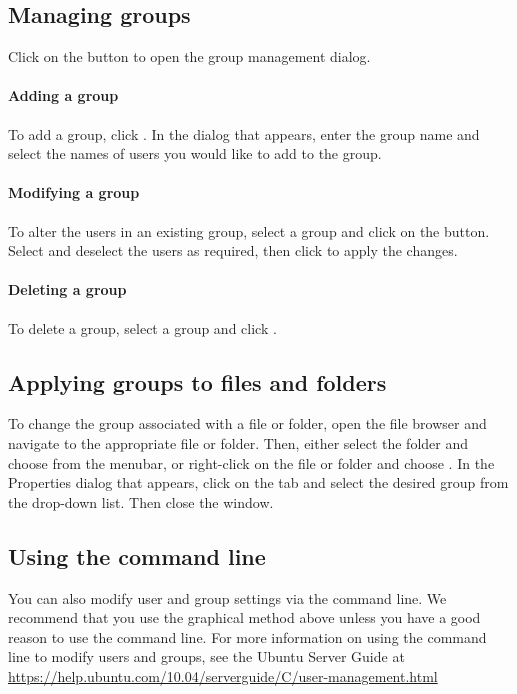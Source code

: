 \subsection{Managing groups}
\label{sec:security:managing-groups}

Click on the  button to open the group management dialog.

\paragraph{Adding a group}
To add a group, click . In the dialog that appears, enter the group name and select the names of users you would like to add to the group.

\paragraph{Modifying a group}
To alter the users in an existing group, select a group and click on the  button. Select and deselect the users as required, then click  to apply the changes.

\paragraph{Deleting a group}
To delete a group, select a group and click .

\subsection{Applying groups to files and folders}

To change the group associated with a file or folder, open the  file browser and navigate to the appropriate file or folder. Then, either select the folder and choose  from the menubar, or right-click on the file or folder and choose . In the Properties dialog that appears, click on the  tab and select the desired group from the  drop-down list. Then close the window.

\subsection{Using the command line}

You can also modify user and group settings via the command line. We recommend that you use the graphical method above unless you have a good reason to use the command line. For more information on using the command line to modify users and groups, see the Ubuntu Server Guide at \href{https://help.ubuntu.com/10.04/serverguide/C/user-management.html}{https://help.ubuntu.com/10.04/serverguide/C/user-management.html}

